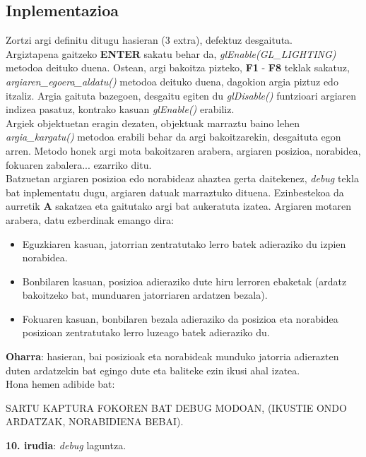 \documentclass[12pt]{article}
\newcommand{\metodo}[1] {\textit{#1}}
\newcommand{\tekla}[1] {\textbf{#1}}
\begin{document}
\subsection{Inplementazioa}

Zortzi argi definitu ditugu hasieran (3 extra), defektuz desgaituta.\\
Argiztapena gaitzeko \tekla{ENTER} sakatu behar da, \metodo{glEnable(GL\_LIGHTING)} metodoa deituko duena. Ostean, argi bakoitza pizteko, \tekla{F1} - \tekla{F8} teklak sakatuz, \metodo{argiaren\_egoera\_aldatu()} metodoa deituko duena, dagokion argia piztuz edo itzaliz. Argia gaituta bazegoen, desgaitu egiten du \metodo{glDisable()} funtzioari argiaren indizea pasatuz, kontrako kasuan \metodo{glEnable()} erabiliz.\\

Argiek objektuetan eragin dezaten, objektuak marraztu baino lehen \metodo{argia\_kargatu()} metodoa erabili behar da argi bakoitzarekin, desgaituta egon arren. Metodo honek argi mota bakoitzaren arabera, argiaren posizioa, norabidea, fokuaren zabalera... ezarriko ditu.\\

Batzuetan argiaren posizioa edo norabideaz ahaztea gerta daitekenez, \textit{debug} tekla bat inplementatu dugu, argiaren datuak marraztuko dituena. Ezinbestekoa da aurretik \tekla{A} sakatzea eta gaitutako argi bat aukeratuta izatea. Argiaren motaren arabera, datu ezberdinak emango dira:

\begin{itemize}

\item Eguzkiaren kasuan, jatorrian zentratutako lerro batek adieraziko du izpien norabidea.

\item Bonbilaren kasuan, posizioa adieraziko dute hiru lerroren ebaketak (ardatz bakoitzeko bat, munduaren jatorriaren ardatzen bezala).

\item Fokuaren kasuan, bonbilaren bezala adieraziko da posizioa eta norabidea posizioan zentratutako lerro luzeago batek adieraziko du.

\end{itemize}

\textbf{Oharra}: hasieran, bai posizioak eta norabideak munduko jatorria adierazten duten ardatzekin bat egingo dute eta baliteke ezin ikusi ahal izatea.\\

Hona hemen adibide bat:
\begin{center}
SARTU KAPTURA FOKOREN BAT DEBUG MODOAN, (IKUSTIE ONDO ARDATZAK, NORABIDIENA BEBAI).

\textbf{10. irudia}: \textit{debug} laguntza.
\end{center}
\end{document}
